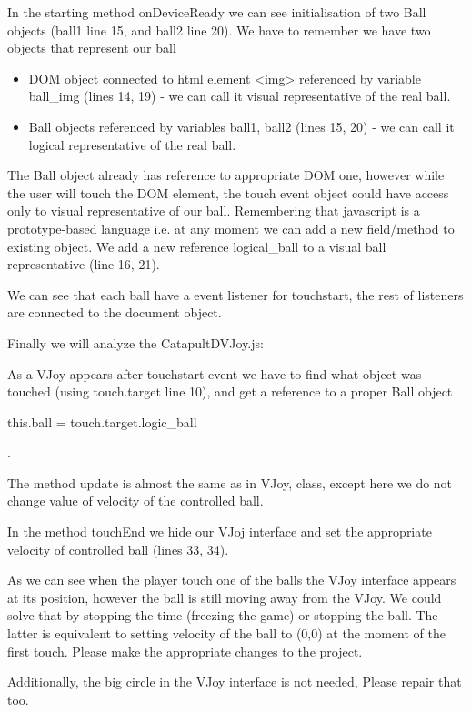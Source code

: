 \begin{explain}
In the starting method onDeviceReady we can see initialisation of two Ball objects (ball1 line 15, and ball2 line 20). We have to remember we have two objects that represent our ball
\begin{itemize}
\item DOM object connected to html element <img> referenced by variable ball\_img (lines 14, 19) - we can call it visual representative of the real ball.
\item Ball objects referenced by variables ball1, ball2 (lines 15, 20) - we can call it logical representative of the real ball.
\end{itemize}
The Ball object already has reference to appropriate DOM one, however while the user will touch the DOM element, the touch event object could have access only to visual representative of our ball. Remembering that javascript is a prototype-based language i.e. at any moment we can add a new field/method to existing object. We add a new reference logical\_ball to a visual ball representative (line 16, 21).

We can see that each ball have a event listener for touchstart, the rest of listeners are connected to the document object.
\end{explain}

Finally we will analyze the CatapultDVJoy.js:


\begin{explain}
As a VJoy appears after touchstart event we have to find what object was touched (using touch.target line 10), and get a reference to a proper Ball object \begin{warning} this.ball = touch.target.logic\_ball\end{warning}.

The method update is almost the same as in VJoy, class, except here we do not change value of velocity of the controlled ball.

In the method touchEnd we hide our VJoj interface and set the appropriate velocity of controlled ball (lines 33, 34).
\end{explain}

\begin{extercises}
As we can see when the player touch one of the balls the VJoy interface appears at its position, however the ball is still moving away from the VJoy. We could solve that by stopping the time (freezing the game) or stopping the ball. The latter is equivalent to setting velocity of the ball to (0,0) at the moment of the first touch. Please make the appropriate changes to the project.

Additionally, the big circle in the VJoy interface is not needed, Please repair that too.

\end{extercises}


